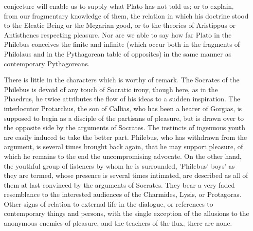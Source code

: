 \documentclass[11pt,letter]{article}
\begin{document}
conjecture will enable us to supply what Plato has not told us; or to explain, from our fragmentary knowledge of them, the relation in which his doctrine stood to the Eleatic Being or the Megarian good, or to the theories of Aristippus or Antisthenes respecting pleasure. Nor are we able to say how far Plato in the Philebus conceives the finite and infinite (which occur both in the fragments of Philolaus and in the Pythagorean table of opposites) in the same manner as contemporary Pythagoreans.

\par  There is little in the characters which is worthy of remark. The Socrates of the Philebus is devoid of any touch of Socratic irony, though here, as in the Phaedrus, he twice attributes the flow of his ideas to a sudden inspiration. The interlocutor Protarchus, the son of Callias, who has been a hearer of Gorgias, is supposed to begin as a disciple of the partisans of pleasure, but is drawn over to the opposite side by the arguments of Socrates. The instincts of ingenuous youth are easily induced to take the better part. Philebus, who has withdrawn from the argument, is several times brought back again, that he may support pleasure, of which he remains to the end the uncompromising advocate. On the other hand, the youthful group of listeners by whom he is surrounded, 'Philebus' boys' as they are termed, whose presence is several times intimated, are described as all of them at last convinced by the arguments of Socrates. They bear a very faded resemblance to the interested audiences of the Charmides, Lysis, or Protagoras. Other signs of relation to external life in the dialogue, or references to contemporary things and persons, with the single exception of the allusions to the anonymous enemies of pleasure, and the teachers of the flux, there are none.
\end{document}
